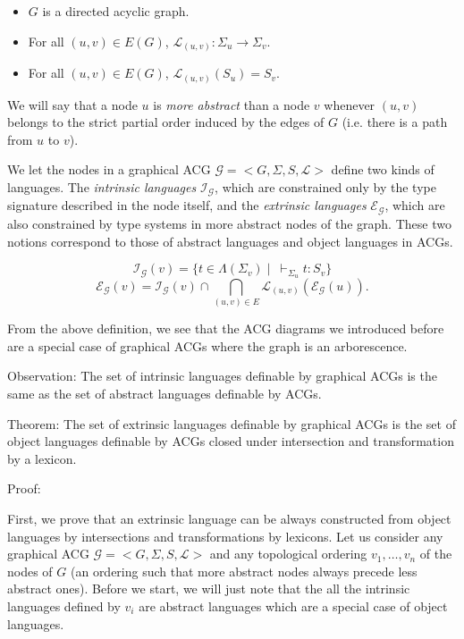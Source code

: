 \begin{itemize}
\item $G$ is a directed acyclic graph.
\item For all $(u,v) \in E(G)$, $\mathcal{L}_{(u,v)} : \Sigma_u \to
  \Sigma_v$.
\item For all $(u,v) \in E(G)$, $\mathcal{L}_{(u,v)}(S_u) = S_v$.
\end{itemize}

We will say that a node $u$ is \emph{more abstract} than a node $v$
whenever $(u,v)$ belongs to the strict partial order induced by the
edges of $G$ (i.e. there is a path from $u$ to $v$).

We let the nodes in a graphical ACG $\mathcal{G} = \mathopen{<} G,
\Sigma, S, \mathcal{L} \mathclose{>}$ define two kinds of
languages. The \emph{intrinsic languages} $\mathcal{I}_{\mathcal{G}}$,
which are constrained only by the type signature described in the node
itself, and the \emph{extrinsic languages} $\mathcal{E}_{\mathcal{G}}$,
which are also constrained by type systems in more abstract nodes of the
graph. These two notions correspond to those of abstract languages and
object languages in ACGs.

$$
\mathcal{I}_{\mathcal{G}}(v) = \{t \in \Lambda(\Sigma_v)
\mid\ \vdash_{\Sigma_u} t : S_v\}
$$
$$
\mathcal{E}_{\mathcal{G}}(v) = \mathcal{I}_{\mathcal{G}}(v) \cap
\bigcap_{(u,v) \in E} \mathcal{L}_{(u,v)}(\mathcal{E}_{\mathcal{G}}(u)).
$$

From the above definition, we see that the ACG diagrams we introduced
before are a special case of graphical ACGs where the graph is an
arborescence.


Observation: The set of intrinsic languages definable by graphical ACGs
is the same as the set of abstract languages definable by ACGs.

Theorem: The set of extrinsic languages definable by graphical ACGs is
the set of object languages definable by ACGs closed under intersection
and transformation by a lexicon.

Proof:

First, we prove that an extrinsic language can be always constructed
from object languages by intersections and transformations by
lexicons. Let us consider any graphical ACG $\mathcal{G} = \mathopen{<}
G, \Sigma, S, \mathcal{L} \mathclose{>}$ and any topological ordering
$v_1, \ldots, v_n$ of the nodes of $G$ (an ordering such that more
abstract nodes always precede less abstract ones). Before we start, we
will just note that the all the intrinsic languages defined by $v_i$ are
abstract languages which are a special case of object languages.


